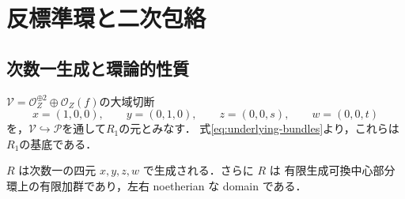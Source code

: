 \section{反標準環と二次包絡}
\label{sec:quadratic-obstruction}

\subsection{次数一生成と環論的性質}
\label{subsec:generation-all-degrees}

$\mathcal V=\mathcal O_Z^{\oplus2}\oplus\mathcal O_Z(f)$の大域切断
\[
 x=(1,0,0),\qquad y=(0,1,0),\qquad
 z=(0,0,s),\qquad w=(0,0,t)
\]
を，$\mathcal V\hookrightarrow\mathcal P$を通して$R_1$の元とみなす．
式\eqref{eq:underlying-bundles}より，これらは$R_1$の基底である．

\begin{proposition}
\label{prop:generation-all-degrees}
$R$ は次数一の四元 $x,y,z,w$ で生成される．さらに $R$ は
有限生成可換中心部分環上の有限加群であり，左右 noetherian な domain である．
\end{proposition}

